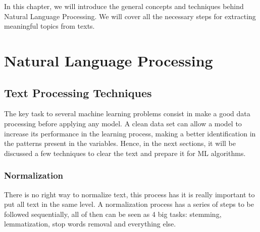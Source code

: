 In this chapter, we will introduce the general concepts and techniques behind Natural Language Processing. We will cover all the necessary steps for extracting meaningful topics from texts. %


\section{Natural Language Processing}


	\subsection{Text Processing Techniques}
	
	The key task to several machine learning problems consist in make a good data processing before applying any model. A clean data set can allow a model to increase its performance in the learning process, making a better identification in the patterns present in the variables. Hence, in the next sections, it will be discussed a few techniques to clear the text and prepare it for ML algorithms.
	
	\subsubsection{Normalization}
	
	There is no right way to normalize text, this process has it is really important to put all text in the same level. A normalization process has a series of steps to be followed sequentially, all of then can be seen as 4 big tasks: stemming, lemmatization, stop words removal and everything else.
	
